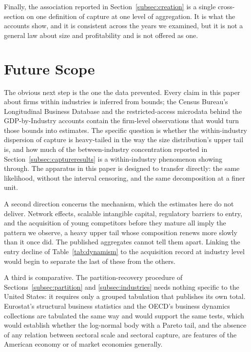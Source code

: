\documentclass[jrfm,article,submit,pdftex,moreauthors]{Definitions/mdpi}
\begin{document}
Finally, the association reported in Section~\ref{subsec:creation} is a single cross-section
on one definition of capture at one level of aggregation. It is what the accounts show, and
it is consistent across the years we examined, but it is not a general law about size and
profitability and is not offered as one.

\section{Future Scope}
\label{sec:future}

The obvious next step is the one the data prevented. Every claim in this paper about firms
within industries is inferred from bounds; the Census Bureau's Longitudinal Business Database
and the restricted-access microdata behind the GDP-by-Industry accounts contain the firm-level
observations that would turn those bounds into estimates. The specific question is whether
the within-industry dispersion of capture is heavy-tailed in the way the size distribution's
upper tail is, and how much of the between-industry concentration reported in
Section~\ref{subsec:captureresults} is a within-industry phenomenon showing through.
The apparatus in this paper is designed to transfer directly: the same likelihood, without
the interval censoring, and the same decomposition at a finer unit.

A second direction concerns the mechanism, which the estimates here do not deliver. Network
effects, scalable intangible capital, regulatory barriers to entry, and the acquisition of
young competitors before they mature all imply the pattern we observe, a heavy upper tail
whose composition renews more slowly than it once did. The published aggregates cannot tell
them apart. Linking the entry decline of Table~\ref{tab:dynamism} to the acquisition
record at industry level would begin to separate the last of these from the others.

A third is comparative. The partition-recovery procedure of Sections~\ref{subsec:partition}
and \ref{subsec:industries} needs nothing specific to the United States: it requires only a
grouped tabulation that publishes its own total. Eurostat's structural business statistics
and the OECD's business dynamics collections are tabulated the same way and would support the
same tests, which would establish whether the log-normal body with a Pareto tail, and the
absence of any relation between sectoral scale and sectoral capture, are features of the
American economy or of market economies generally.
\end{document}
